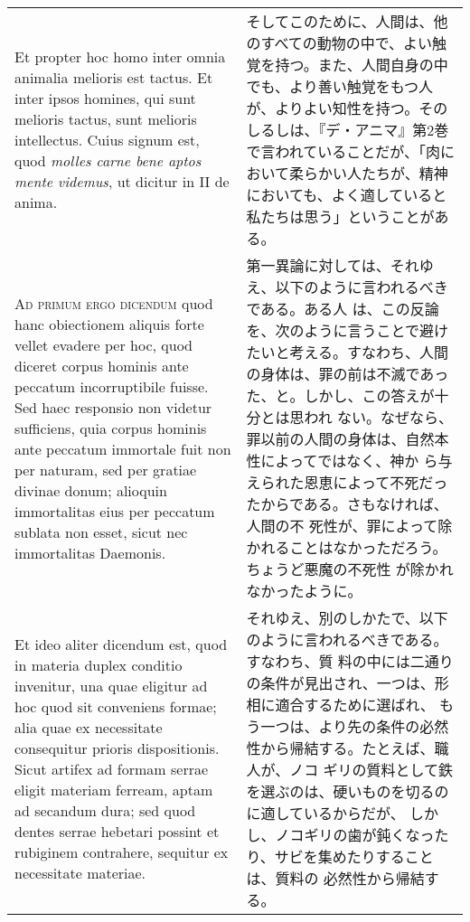 \documentclass[paper=a4paper,fontsize=10pt,jafontsize=9pt,titlepage]{jlreq}
\begin{document}
\begin{longtable}{p{21em}p{21em}}
\\


 Et propter hoc homo inter omnia animalia melioris est tactus. Et
 inter ipsos homines, qui sunt melioris tactus, sunt melioris
 intellectus. Cuius signum est, quod {\itshape molles carne bene aptos
 mente videmus}, ut dicitur in II de anima.

&

そしてこのために、人間は、他のすべての動物の中で、よい触覚を持つ。また、人間自身の中でも、より善い触覚をもつ人が、よりよい知性を持つ。そのしるしは、『デ・アニマ』第2巻で言われていることだが、「肉において柔らかい人たちが、精神においても、よく適していると私たちは思う」ということがある。
 
\\



 {\scshape Ad primum ergo dicendum} quod hanc obiectionem aliquis
 forte vellet evadere per hoc, quod diceret corpus hominis ante
 peccatum incorruptibile fuisse. Sed haec responsio non videtur
 sufficiens, quia corpus hominis ante peccatum immortale fuit non per
 naturam, sed per gratiae divinae donum; alioquin immortalitas eius
 per peccatum sublata non esset, sicut nec immortalitas Daemonis.

&

 第一異論に対しては、それゆえ、以下のように言われるべきである。ある人
 は、この反論を、次のように言うことで避けたいと考える。すなわち、人間
 の身体は、罪の前は不滅であった、と。しかし、この答えが十分とは思われ
 ない。なぜなら、罪以前の人間の身体は、自然本性によってではなく、神か
 ら与えられた恩恵によって不死だったからである。さもなければ、人間の不
 死性が、罪によって除かれることはなかっただろう。ちょうど悪魔の不死性
 が除かれなかったように。
 
\\


 Et ideo aliter dicendum est, quod in materia duplex conditio
 invenitur, una quae eligitur ad hoc quod sit conveniens formae; alia
 quae ex necessitate consequitur prioris dispositionis. Sicut artifex
 ad formam serrae eligit materiam ferream, aptam ad secandum dura; sed
 quod dentes serrae hebetari possint et rubiginem contrahere, sequitur
 ex necessitate materiae.

&

 それゆえ、別のしかたで、以下のように言われるべきである。すなわち、質
 料の中には二通りの条件が見出され、一つは、形相に適合するために選ばれ、
 もう一つは、より先の条件の必然性から帰結する。たとえば、職人が、ノコ
 ギリの質料として鉄を選ぶのは、硬いものを切るのに適しているからだが、
 しかし、ノコギリの歯が鈍くなったり、サビを集めたりすることは、質料の
 必然性から帰結する。
 

\end{longtable}
\end{document}
